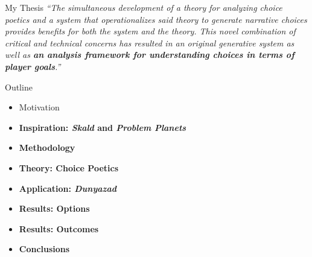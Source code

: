 \documentclass[xcolor=x11names]{beamer}
\def\dunyazad/{\textit{Dunyazad}}
\def\skald/{\textit{Skald}}
\def\problemplanets/{\textit{Problem Planets}}
\begin{document}
\begin{frame}{My Thesis}
  \justifying
  \itshape
  ``The simultaneous development of a theory for analyzing choice poetics and a system that operationalizes said theory to generate narrative choices provides benefits for both the system and the theory. This novel combination of critical and technical concerns has resulted in an original generative system as well as \textbf{an analysis framework for understanding choices in terms of player goals}.''
\end{frame}

\begin{frame}{Outline}
  \begin{itemize}
    \item Motivation
    \item \textbf{Inspiration: \skald/ and \problemplanets/}
    \item \textbf{Methodology}
    \item \textbf{Theory: Choice Poetics}
    \item \textbf{Application: \dunyazad/}
    \item \textbf{Results: Options}
    \item \textbf{Results: Outcomes}
    \item \textbf{Conclusions}
  \end{itemize}
\end{frame}
\end{document}
